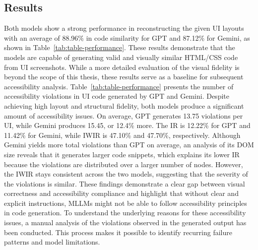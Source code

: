 \subsection{Results}
Both models show a strong performance in reconstructing the given 
UI layouts with an average of 88.96\% in code similarity
for GPT and 87.12\% for Gemini, as shown in Table~\ref{tab:table-performance}.
These results demonstrate that the models are capable of generating 
valid and visually similar HTML/CSS code from UI screenshots. 
While a more detailed evaluation of the visual fidelity is beyond 
the scope of this thesis, these results serve as a baseline 
for subsequent accessibility analysis.
Table~\ref{tab:table-performance} presents the number of accessibility 
violations in UI code generated by GPT and Gemini. Despite 
achieving high layout and structural fidelity, both models produce 
a significant amount of accessibility issues. On average, GPT 
generates 13.75 violations per UI, while Gemini produces 15.45, or 12.4\% 
more. The IR is 12.22\% for GPT and 11.42\% for Gemini,
while IWIR is 47.10\% and 47.70\%, respectively. Although Gemini yields
more total violations than GPT on average, an analysis of its DOM size 
reveals that it generates larger code snippets, which explains
its lower IR because the violations are distributed over a larger 
number of nodes. However, the IWIR stays consistent across the two models, 
suggesting that the severity of the violations is similar.
These findings demonstrate a clear gap between visual correctness and 
accessibility compliance and highlight that without clear and 
explicit instructions, MLLMs might not be able to follow 
accessibility principles in code generation. To understand 
the underlying reasons for these accessibility issues, a manual 
analysis of the violations observed in the generated output
has been conducted. This process makes it possible to identify recurring 
failure patterns and model limitations.




